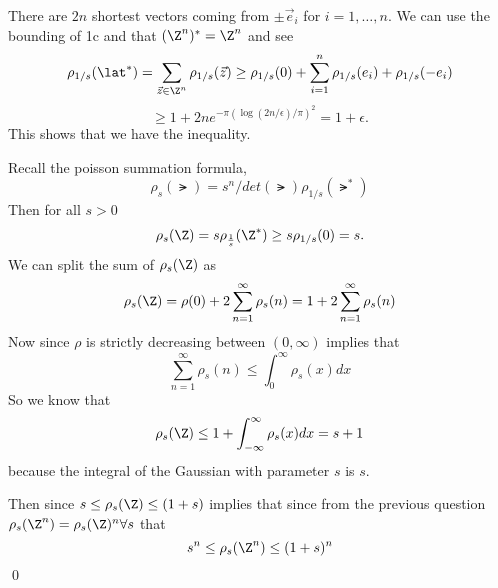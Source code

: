 \documentclass[12pt]{amsart}
\begin{document}
\begin{problem}
\begin{subproblem}
      There are $2n$ shortest vectors coming from $\pm \vec{e}_i$ for $i = 1, \dots, n.$
      We can use the bounding of 1c and that $(\Z^n)^* = \Z^n$ and see
      \[\rho_{1/s}(\lat^*) = \sum_{\vec{z} \in \Z^n}{\rho_{1/s}(\vec{z})} \geq \rho_{1/s}(0) + \sum_{i=1}^{n}{ \rho_{1/s}(e_i)+ \rho_{1/s}(-e_i)} \]
      \[ \geq 1+2n e^{-\pi\left(\log(2n/\epsilon)/\pi\right)^2} = 1+\epsilon.\]
      This shows that we have the inequality.
    \end{subproblem}
    \begin{subproblem}
      Recall the poisson summation formula, 
      \[\rho_s(\lat) = s^n/det(\lat) \rho_{1/s}(\lat^*)\]
      Then for all $s > 0$
      \[\rho_s(\Z) = s \rho_{\frac1s}(\Z^*) \geq s\rho_{1/s}(0) = s.\]
      We can split the sum of $\rho_s(\Z)$ as 
      \[\rho_s(\Z) = \rho(0) + 2 \sum_{n=1}^\infty \rho_s(n) = 1 + 2\sum_{n=1}^\infty \rho_s(n)\]
      Now since $\rho$ is strictly decreasing between $(0,\infty)$ implies that 
      \[\sum_{n=1}^{\infty}{\rho_{s}(n)} \leq \int_{0}^{\infty}{\rho_s(x) dx}\]
      So we know that 
      \[\rho_s(\Z) \leq 1 + \int^\infty_{-\infty}\rho_s(x)dx = s+1\]
      because the integral of the Gaussian with parameter $s$ is $s.$

      Then since $s \leq\rho_s(\Z) \leq (1+s)$ implies that since from the previous question $\rho_s(\Z^n) = \rho_s(\Z)^n\forall s$ that 
      \[s^n \leq \rho_s(\Z^n) \leq (1+s)^n\]\qed
    \end{subproblem}
  \end{problem}
\end{document}
